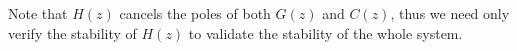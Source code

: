 \documentclass{sig-alternate-05-2015}
\newcommand{\red}[1]{{\color{red}#1}}
\begin{document}
Note that $H(z)$ cancels the poles of both $G(z)$ and $C(z)$, thus we need only verify the stability of $H(z)$
to validate the stability of the whole system.
%
%
%
\end{document}

